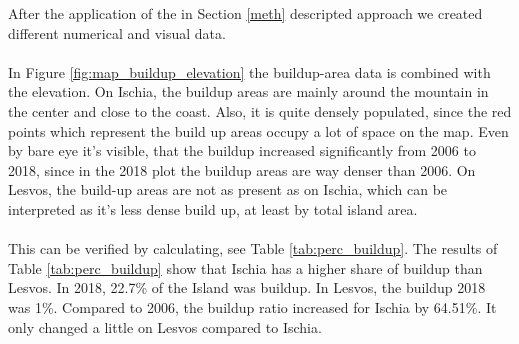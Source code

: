 \documentclass[10pt, twocolumn, twoside]{article}
\begin{document}
\begin{table}[b]
\caption{Raster Count of buildup area of slope class}
\label{tab:results}
\end{table}

After the application of the in Section \ref{meth} descripted approach we created different numerical and visual data.\\\\
In Figure \ref{fig:map_buildup_elevation} the buildup-area data is combined with the elevation. On Ischia, the buildup areas are mainly around the mountain in the center and close to the coast. Also, it is quite densely populated, since the red points which represent the build up areas occupy a lot of space on the map. Even by bare eye it's visible, that the buildup increased significantly from 2006 to 2018, since in the 2018 plot the buildup areas are way denser than 2006. On Lesvos, the build-up areas are not as present as on Ischia, which can be interpreted as it's less dense build up, at least by total island area.  \\\\This can be verified by calculating, see Table \ref{tab:perc_buildup}. The results of Table \ref{tab:perc_buildup} show that Ischia has a higher share of buildup  than Lesvos. In 2018, 22.7\% of the Island was buildup. In Lesvos, the buildup 2018 was 1\%. Compared to 2006, the buildup ratio increased for Ischia by 64.51\%. It only changed a little on Lesvos compared to Ischia. 
\end{document}
